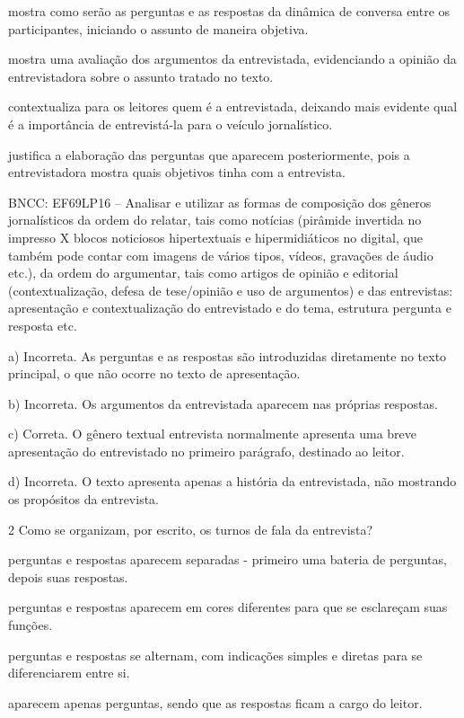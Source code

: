 \begin{escolha}
\item mostra como serão as perguntas e as respostas da dinâmica de
conversa entre os participantes, iniciando o assunto de maneira
objetiva.

\item mostra uma avaliação dos argumentos da entrevistada, evidenciando a
opinião da entrevistadora sobre o assunto tratado no texto.

\item contextualiza para os leitores quem é a entrevistada, deixando mais
evidente qual é a importância de entrevistá-la para o veículo
jornalístico.

\item justifica a elaboração das perguntas que aparecem posteriormente,
pois a entrevistadora mostra quais objetivos tinha com a entrevista.
\end{escolha}

BNCC: EF69LP16 -- Analisar e utilizar as formas de composição dos
gêneros jornalísticos da ordem do relatar, tais como notícias (pirâmide
invertida no impresso X blocos noticiosos hipertextuais e
hipermidiáticos no digital, que também pode contar com imagens de vários
tipos, vídeos, gravações de áudio etc.), da ordem do argumentar, tais
como artigos de opinião e editorial (contextualização, defesa de
tese/opinião e uso de argumentos) e das entrevistas: apresentação e
contextualização do entrevistado e do tema, estrutura pergunta e
resposta etc.

a) Incorreta. As perguntas e as respostas são introduzidas diretamente
no texto principal, o que não ocorre no texto de apresentação.

b) Incorreta. Os argumentos da entrevistada aparecem nas próprias
respostas.

c) Correta. O gênero textual entrevista normalmente apresenta uma breve
apresentação do entrevistado no primeiro parágrafo, destinado ao leitor.

d) Incorreta. O texto apresenta apenas a história da entrevistada, não
mostrando os propósitos da entrevista.

\num{2} Como se organizam, por escrito, os turnos de fala da entrevista?

\begin{escolha}
\item perguntas e respostas aparecem separadas - primeiro uma bateria de
perguntas, depois suas respostas.

\item perguntas e respostas aparecem em cores diferentes para que se
esclareçam suas funções.

\item perguntas e respostas se alternam, com indicações simples e diretas
para se diferenciarem entre si.

\item aparecem apenas perguntas, sendo que as respostas ficam a cargo do
leitor.
\end{escolha}

